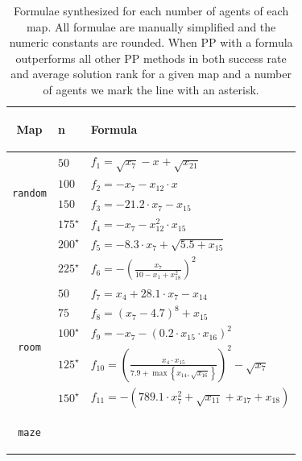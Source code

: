 \begin{table}[t!]
        \caption{Formulae synthesized for each number of agents of each map. All formulae are manually simplified and the numeric constants are rounded. When PP with a formula outperforms all other PP methods in both success rate and average solution rank for a given map and a number of agents we mark the line with an asterisk.}
        \label{tab:all_maps_synth_results}
        \centering
        {\small
        \begin{tabular}{c|l|l}
            \toprule
            \begin{turn}{90} \textbf{Map} \end{turn} & \textbf{n} & \textbf{Formula} \\
            \midrule
            \multirow{4}{*}{\begin{turn}{90} {\tt random} \end{turn}}
            & $ 50 $ & $ f_{1} = \sqrt{x_{7}} - x_{} + \sqrt{x_{21}} $ \\
            & $ 100 $ & $ f_{2} = - x_{7} - x_{12} \cdot x_{} $ \\
            & $ 150 $ & $ f_{3} = - 21.2 \cdot x_{7} - x_{15} $ \\
            & $ 175^\star $ & $ f_{4} = -x_{7} - x_{12}^2 \cdot x_{15} $ \\
            & $ 200^\star $ & $ f_{5} = - 8.3 \cdot x_{7} + \sqrt{5.5 + x_{15}} $ \\
            & $ 225^\star $ & $ f_{6} = -\left(\frac{x_{7}}{10 - x_{1} + x_{18}^2}\right)^2 $ \\
            \hline
            \multirow{5}{*}{\begin{turn}{90} {\tt room} \end{turn}}
            & $ 50 $ & $ f_{7} = x_{4} + 28.1 \cdot x_{7} - x_{14} $ \\
            & $ 75 $ & $ f_{8} = \left(x_{7} - 4.7\right)^8 + x_{15} $ \\
            & $ 100^\star $ & $ f_{9} = - x_{7} - \left(0.2 \cdot x_{15} \cdot x_{16}\right)^2 $ \\
            & $ 125^\star $ & $ f_{10} = \left(\frac{x_{4} \cdot x_{15}}{7.9 + \max\left\{x_{14}, \sqrt{x_{16}}\right\}}\right)^2 -\sqrt{x_{7}} $ \\
            & $ 150^\star $ & $ f_{11} = -(789.1 \cdot x_{7}^2 + \sqrt{x_{11}} + x_{17} + x_{18}) $ \\
            \hline
            \multirow{5}{*}{\begin{turn}{90} {\tt maze} \end{turn}}

\end{tabular}}
\end{table}
